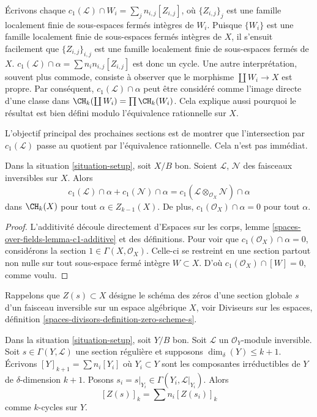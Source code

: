 \noindent
Écrivons chaque $c_1(\mathcal{L}) \cap W_i = \sum_j n_{i, j} [Z_{i, j}]$, où
$\{Z_{i, j}\}_j$ est une famille localement finie de sous-espaces fermés intègres
de $W_i$. Puisque $\{W_i\}$ est une famille localement finie de
sous-espaces fermés intègres de $X$, il s'ensuit facilement que $\{Z_{i,
j}\}_{i, j}$ est une famille localement finie de sous-espaces fermés de
$X$. $c_1(\mathcal{L}) \cap \alpha = \sum n_in_{i, j}[Z_{i, j}]$ est donc un
cycle. Une autre interprétation, souvent plus commode, consiste à observer
que le morphisme $\coprod W_i \to X$ est propre. Par conséquent,
$c_1(\mathcal{L}) \cap \alpha$ peut être considéré comme l’image directe d’une
classe dans $\CH_k(\coprod W_i) = \prod \CH_k(W_i)$. Cela explique aussi
pourquoi le résultat est bien défini modulo l'équivalence rationnelle sur $X$.

\medskip\noindent
L'objectif principal des prochaines sections est de montrer que l'intersection
par $c_1(\mathcal{L})$ passe au quotient par l'équivalence rationnelle. Cela
n'est pas immédiat.

\begin{lemma}
\label{lemma-c1-cap-additive}
Dans la situation \ref{situation-setup}, soit $X/B$ bon. Soient
$\mathcal{L}$, $\mathcal{N}$ des faisceaux inversibles sur $X$. Alors
$$
c_1(\mathcal{L}) \cap \alpha  + c_1(\mathcal{N}) \cap \alpha =
c_1(\mathcal{L} \otimes_{\mathcal{O}_X} \mathcal{N}) \cap \alpha
$$
dans $\CH_k(X)$ pour tout $\alpha \in Z_{k - 1}(X)$. De plus,
$c_1(\mathcal{O}_X) \cap \alpha = 0$ pour tout $\alpha$.
\end{lemma}

\begin{proof}
L'additivité découle directement d'Espaces sur les corps, lemme
\ref{spaces-over-fields-lemma-c1-additive} et des définitions. Pour voir que
$c_1(\mathcal{O}_X) \cap \alpha = 0$, considérons la section $1 \in \Gamma(X,
\mathcal{O}_X)$. Celle-ci se restreint en une section partout non nulle sur tout
sous-espace fermé intègre $W \subset X$. D'où $c_1(\mathcal{O}_X) \cap [W] =
0$, comme voulu.
\end{proof}

\noindent
Rappelons que $Z(s) \subset X$ désigne le schéma des zéros d'une section globale $s$
d'un faisceau inversible sur un espace algébrique $X$, voir Diviseurs sur les
espaces, définition \ref{spaces-divisors-definition-zero-scheme-s}.

\begin{lemma}
\label{lemma-prepare-geometric-cap}
Dans la situation \ref{situation-setup}, soit $Y/B$ bon. Soit
$\mathcal{L}$ un $\mathcal{O}_Y$-module inversible. Soit $s \in \Gamma(Y,
\mathcal{L})$ une section régulière et supposons $\dim_\delta(Y) \leq k + 1$.
Écrivons $[Y]_{k + 1} = \sum n_i[Y_i]$ où $Y_i \subset Y$ sont les composantes
irréductibles de $Y$ de $\delta$-dimension $k + 1$. Posons $s_i = s|_{Y_i}
\in \Gamma(Y_i, \mathcal{L}|_{Y_i})$. Alors
\begin{equation}
\label{equation-equal-as-cycles}
[Z(s)]_k =  \sum n_i[Z(s_i)]_k
\end{equation}
comme $k$-cycles sur $Y$.
\end{lemma}

